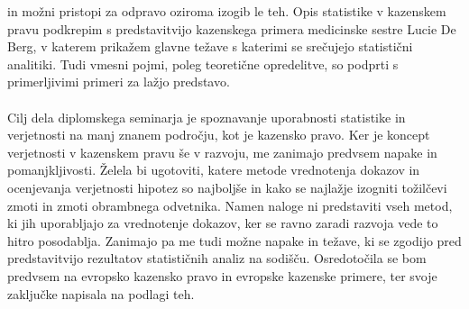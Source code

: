 \documentclass[fin1, tisk]{fmfdelo}
\theoremstyle{definition}
\theoremstyle{trditev}
\theoremstyle{izrek}
\begin{document}
in možni pristopi za odpravo oziroma izogib le teh. Opis statistike v kazenskem pravu podkrepim s predstavitvijo kazenskega primera medicinske 
sestre Lucie De Berg, v katerem prikažem glavne težave s katerimi se srečujejo statistični analitiki. Tudi vmesni pojmi, 
poleg teoretične opredelitve, so podprti s primerljivimi primeri za lažjo predstavo.\\\\
Cilj dela diplomskega seminarja je spoznavanje uporabnosti statistike in verjetnosti na manj znanem področju, kot je kazensko pravo. Ker je koncept 
verjetnosti v kazenskem pravu še v razvoju, me zanimajo predvsem napake in pomanjkljivosti. Želela bi ugotoviti, katere metode vrednotenja 
dokazov in ocenjevanja verjetnosti hipotez so najboljše in kako se najlažje izogniti tožilčevi zmoti in zmoti obrambnega odvetnika. Namen 
naloge ni predstaviti vseh metod, ki jih uporabljajo za vrednotenje dokazov, ker se ravno zaradi razvoja vede to hitro posodablja. Zanimajo pa 
me tudi možne napake in težave, ki se zgodijo pred predstavitvijo rezultatov statističnih analiz na sodišču. Osredotočila se bom 
predvsem na evropsko kazensko pravo in evropske kazenske primere, ter svoje zaključke napisala na podlagi teh.

\end{document}
